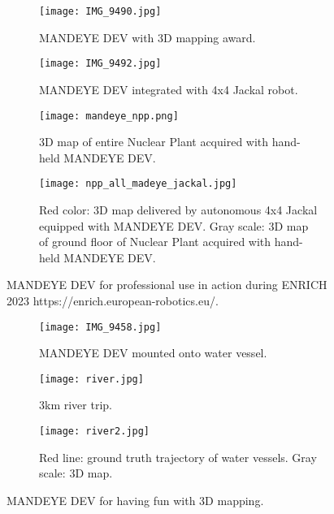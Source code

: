  \begin{figure}
 	\centering
 	\begin{subfigure}[b]{0.4\textwidth}
 		\centering
 		\texttt{[image: IMG\_9490.jpg]}
 		\caption{MANDEYE DEV with 3D mapping award.}
 		\label{fig:a}
 	\end{subfigure}
 	\hfill
 	\begin{subfigure}[b]{0.4\textwidth}
 		\centering
 		\texttt{[image: IMG\_9492.jpg]}
 		\caption{MANDEYE DEV integrated with 4x4 Jackal robot.}
 		\label{fig:b}
 	\end{subfigure}
 	\hfill
 	\begin{subfigure}[b]{0.7\textwidth}
 		\centering
 		\texttt{[image: mandeye\_npp.png]}
 		\caption{3D map of entire Nuclear Plant acquired with hand-held MANDEYE DEV.}
 		\label{fig:c}
 	\end{subfigure}
 	\hfill
 	\begin{subfigure}[b]{0.7\textwidth}
 		\centering
 		\texttt{[image: npp\_all\_madeye\_jackal.jpg]}
 		\caption{Red color: 3D map delivered by autonomous 4x4 Jackal equipped with MANDEYE DEV. Gray scale: 3D map of ground floor of Nuclear Plant acquired with hand-held MANDEYE DEV.}
 		\label{fig:d}
 	\end{subfigure}
  	\caption{MANDEYE DEV for professional use in action during ENRICH 2023 https://enrich.european-robotics.eu/.}
 	\label{fig:abcd}
 \end{figure}

\begin{figure}
	\centering
	\begin{subfigure}[b]{0.4\textwidth}
		\centering
		\texttt{[image: IMG\_9458.jpg]}
		\caption{MANDEYE DEV mounted onto water vessel.}
		\label{fig:a2}
	\end{subfigure}
	\hfill
	\begin{subfigure}[b]{0.7\textwidth}
		\centering
		\texttt{[image: river.jpg]}
		\caption{3km river trip.}
		\label{fig:b2}
	\end{subfigure}
	\hfill
	\begin{subfigure}[b]{0.7\textwidth}
		\centering
		\texttt{[image: river2.jpg]}
		\caption{Red line: ground truth trajectory of water vessels. Gray scale: 3D map.}
		\label{fig:c2}
	\end{subfigure}
	\caption{MANDEYE DEV for having fun with 3D mapping.}
	\label{fig:a2b2c2}
\end{figure}

